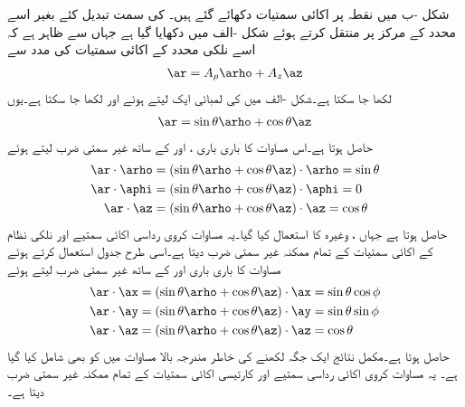 شکل -ب میں نقطہ  پر اکائی سمتیات دکھائے گئے ہیں۔ کی سمت تبدیل کئے بغیر اسے محدد کے مرکز پر منتقل کرتے ہوئے شکل -الف  میں دکھایا گیا ہے جہاں سے ظاہر ہے کہ اسے نلکی محدد کے اکائی سمتیات کی مدد سے
\begin{align}
\ar=A_\rho \arho+A_z \az
\end{align}
لکھا جا سکتا ہے۔شکل -الف  میں  کی لمبائی ایک لیتے ہوئے   اور  لکھا جا سکتا ہے۔یوں
\begin{align}\label{مساوات_سمتیہ_کروی_اکائی_نلکی_منتقل}
\ar=\sin \theta \arho+\cos \theta \az
\end{align}
حاصل ہوتا ہے۔اس مساوات کا باری باری ،  اور  کے ساتھ غیر سمتی ضرب لیتے ہوئے
\begin{gather}
\begin{aligned}\label{مساوات_سمتیہ_کروی_رداس_نلکی_اکائی_غیر_سمتی_ضرب}
\ar \cdot \arho&=(\sin \theta \arho+\cos \theta \az) \cdot \arho=\sin \theta\\
\ar \cdot \aphi&=(\sin \theta \arho+\cos \theta \az) \cdot \aphi=0\\
\ar \cdot \az&=(\sin \theta \arho+\cos \theta \az) \cdot \az=\cos \theta
\end{aligned}
\end{gather}
حاصل ہوتا ہے جہاں ،  وغیرہ کا استعمال کیا گیا۔یہ مساوات کروی رداسی اکائی سمتیے اور نلکی نظام کے اکائی سمتیات کے تمام ممکنہ غیر سمتی ضرب دیتا ہے۔اسی طرح جدول  استعمال کرتے ہوئے  مساوات   کا باری باری  اور  کے ساتھ غیر سمتی ضرب لیتے ہوئے
\begin{gather}
\begin{aligned}\label{مساوات_سمتیہ_کروی_رداس_کے_کارتیسی_اجزاء}
\ar \cdot \ax&=(\sin \theta \arho+\cos \theta \az) \cdot \ax=\sin \theta \cos \phi\\
\ar \cdot \ay&=(\sin \theta \arho+\cos \theta \az) \cdot \ay=\sin \theta \sin \phi\\
\ar \cdot \az&=(\sin \theta \arho+\cos \theta \az) \cdot \az=\cos \theta
\end{aligned}
\end{gather}
حاصل ہوتا ہے۔مکمل نتائج ایک جگہ لکھنے کی خاطر  مندرجہ بالا مساوات میں   کو بھی شامل کیا گیا ہے۔ یہ مساوات کروی اکائی رداسی  سمتیے  اور کارتیسی اکائی سمتیات کے تمام ممکنہ غیر سمتی ضرب دیتا ہے۔

